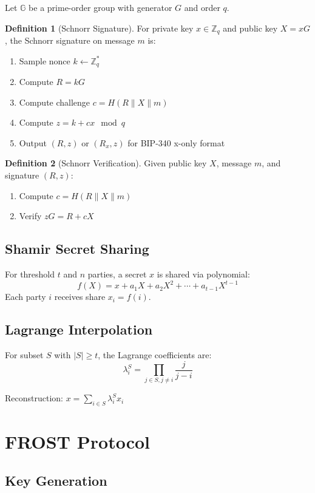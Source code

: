 \documentclass[11pt,a4paper]{article}
\theoremstyle{definition}
\newtheorem{definition}{Definition}
\begin{document}
Let $\mathbb{G}$ be a prime-order group with generator $G$ and order $q$.

\begin{definition}[Schnorr Signature]
For private key $x \in \mathbb{Z}_q$ and public key $X = xG$, the Schnorr signature on message $m$ is:
\begin{enumerate}
\item Sample nonce $k \leftarrow \mathbb{Z}_q^*$
\item Compute $R = kG$
\item Compute challenge $c = H(R \| X \| m)$
\item Compute $z = k + cx \mod q$
\item Output $(R, z)$ or $(R_x, z)$ for BIP-340 x-only format
\end{enumerate}
\end{definition}

\begin{definition}[Schnorr Verification]
Given public key $X$, message $m$, and signature $(R, z)$:
\begin{enumerate}
\item Compute $c = H(R \| X \| m)$
\item Verify $zG = R + cX$
\end{enumerate}
\end{definition}

\subsection{Shamir Secret Sharing}

For threshold $t$ and $n$ parties, a secret $x$ is shared via polynomial:
\[
f(X) = x + a_1 X + a_2 X^2 + \cdots + a_{t-1} X^{t-1}
\]
Each party $i$ receives share $x_i = f(i)$.

\subsection{Lagrange Interpolation}

For subset $S$ with $|S| \geq t$, the Lagrange coefficients are:
\[
\lambda_i^S = \prod_{j \in S, j \neq i} \frac{j}{j - i}
\]

Reconstruction: $x = \sum_{i \in S} \lambda_i^S x_i$

\section{FROST Protocol}

\subsection{Key Generation}
\end{document}
